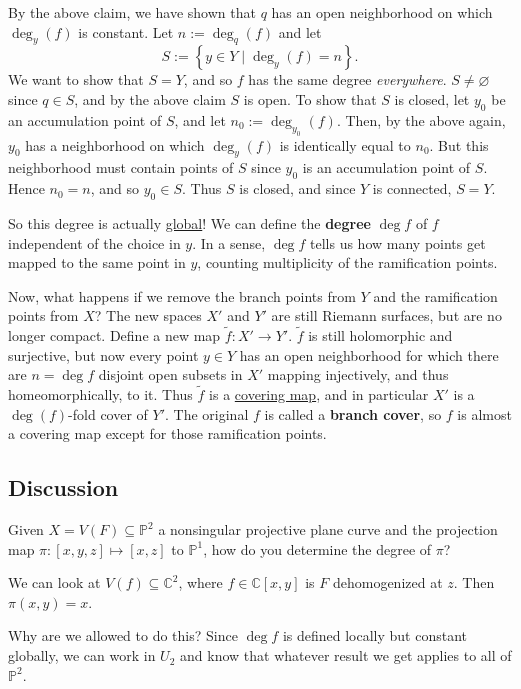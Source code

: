 \documentclass[12pt]{article}
\newcommand{\cx}{\mathbb{C}}
\newcommand{\p}{\mathbb{P}}
\newcommand{\ita}[1]{\textit{#1}}
\newcommand\setb[1]{\left \{ #1 \right \}}
\theoremstyle{definition}
\theoremstyle{remark}
\begin{document}
By the above claim, we have shown that $q$ has an open neighborhood on which $\deg_y(f)$ is constant. Let $n := \deg_q(f)$ and let 
\begin{equation}
    S := \setb{y \in Y \mid \deg_y(f) = n}.
\end{equation}
We want to show that $S = Y$, and so $f$ has the same degree \ita{everywhere}. $S \neq \varnothing$ since $q \in S$, and by the above claim $S$ is open. To show that $S$ is closed, let $y_0$ be an accumulation point of $S$, and let $n_0 := \deg_{y_0}(f)$. Then, by the above again, $y_0$ has a neighborhood on which $\deg_y(f)$ is identically equal to $n_0$. But this neighborhood must contain points of $S$ since $y_0$ is an accumulation point of $S$. Hence $n_0 = n$, and so $y_0 \in S$. Thus $S$ is closed, and since $Y$ is connected, $S = Y$. 

So this degree is actually \underline{global}! We can define the \textbf{degree} $\deg f$ of $f$ independent of the choice in $y$. In a sense, $\deg f$ tells us how many points get mapped to the same point in $y$, counting multiplicity of the ramification points.

Now, what happens if we remove the branch points from $Y$ and the ramification points from $X$? The new spaces $X'$ and $Y'$ are still Riemann surfaces, but are no longer compact. Define a new map $\tilde{f} : X' \to Y'$. $\tilde{f}$ is still holomorphic and surjective, but now every point $y \in Y$ has an open neighborhood for which there are $n = \deg f$ disjoint open subsets in $X'$ mapping injectively, and thus homeomorphically, to it. Thus $\tilde{f}$ is a \underline{covering map}, and in particular $X'$ is a $\deg(f)$-fold cover of $Y'$. The original $f$ is called a \textbf{branch cover}, so $f$ is almost a covering map except for those ramification points.
\subsection{Discussion}
Given $X = V(F) \subseteq \p^2$ a nonsingular projective plane curve and the projection map $\pi : [x,y,z] \mapsto [x,z]$ to $\p^1$, how do you determine the degree of $\pi$?

We can look at $V(f) \subseteq \cx^2$, where $f \in \cx[x,y]$ is $F$ dehomogenized at $z$. Then $\pi(x,y) = x$.

Why are we allowed to do this? Since $\deg f$ is defined locally but constant globally, we can work in $U_2$ and know that whatever result we get applies to all of $\p^2$. 
\end{document}
